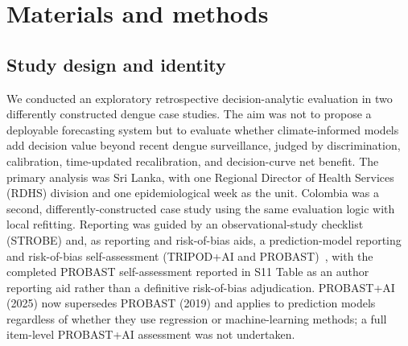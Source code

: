 \documentclass[11pt,a4paper]{article}
\begin{document}
\section{Materials and methods}

\subsection{Study design and identity}
We conducted an exploratory retrospective decision-analytic evaluation in two differently constructed dengue case studies. The aim was not to propose a deployable forecasting system but to evaluate whether climate-informed models add decision value beyond recent dengue surveillance, judged by discrimination, calibration, time-updated recalibration, and decision-curve net benefit. The primary analysis was Sri Lanka, with one Regional Director of Health Services (RDHS) division and one epidemiological week as the unit. Colombia was a second, differently-constructed case study using the same evaluation logic with local refitting. Reporting was guided by an observational-study checklist (STROBE) and, as reporting and risk-of-bias aids, a prediction-model reporting and risk-of-bias self-assessment (TRIPOD+AI and PROBAST)~\cite{vonElm2007,Collins2024TRIPODAI,Wolff2019,Moons2019}, with the completed PROBAST self-assessment reported in S11 Table as an author reporting aid rather than a definitive risk-of-bias adjudication. PROBAST+AI (2025) now supersedes PROBAST (2019) and applies to prediction models regardless of whether they use regression or machine-learning methods; a full item-level PROBAST+AI assessment was not undertaken.
\end{document}
